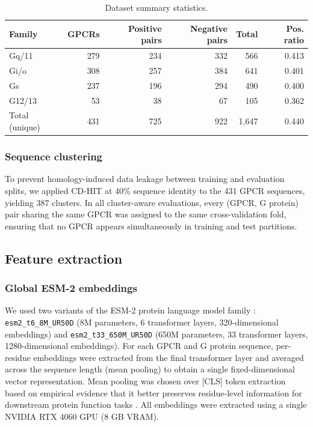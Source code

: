 \documentclass[11pt,a4paper]{article}
\begin{document}
\begin{table}[t]
\centering
\caption{Dataset summary statistics.}
\label{tab:dataset}
\begin{tabular}{lrrrrr}
\toprule
Family & GPCRs & Positive pairs & Negative pairs & Total & Pos. ratio \\
\midrule
Gq/11  & 279 & 234 & 332 & 566 & 0.413 \\
Gi/o   & 308 & 257 & 384 & 641 & 0.401 \\
Gs     & 237 & 196 & 294 & 490 & 0.400 \\
G12/13 &  53 &  38 &  67 & 105 & 0.362 \\
\midrule
Total (unique) & 431 & 725 & 922 & 1,647 & 0.440 \\
\bottomrule
\end{tabular}
\end{table}

\subsubsection{Sequence clustering}

To prevent homology-induced data leakage between training and evaluation splits, we applied CD-HIT \cite{li2006cdhit} at 40\% sequence identity to the 431 GPCR sequences, yielding 387 clusters. In all cluster-aware evaluations, every (GPCR, G protein) pair sharing the same GPCR was assigned to the same cross-validation fold, ensuring that no GPCR appears simultaneously in training and test partitions.

\subsection{Feature extraction}

\subsubsection{Global ESM-2 embeddings}

We used two variants of the ESM-2 protein language model family \cite{lin2023evolutionary}: \texttt{esm2\_t6\_8M\_UR50D} (8M parameters, 6 transformer layers, 320-dimensional embeddings) and \texttt{esm2\_t33\_650M\_UR50D} (650M parameters, 33 transformer layers, 1280-dimensional embeddings). For each GPCR and G protein sequence, per-residue embeddings were extracted from the final transformer layer and averaged across the sequence length (mean pooling) to obtain a single fixed-dimensional vector representation. Mean pooling was chosen over [CLS] token extraction based on empirical evidence that it better preserves residue-level information for downstream protein function tasks \cite{detlefsen2022evaluation}. All embeddings were extracted using a single NVIDIA RTX 4060 GPU (8 GB VRAM).
\end{document}
